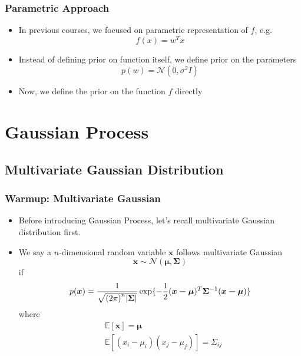 \documentclass{beamer}
\begin{document}
\begin{frame}
	\frametitle{Parametric Approach}
	\begin{itemize}
		\item In previous courses, we focused on parametric representation of $f$, e.g.
		\[
			f(x)=w^Tx
		\]
		\item Instead of defining prior on function itself, we define prior on the parameters
		\[
			p(w) = \mathcal{N}(0, \sigma^2 I)
		\]
		\item Now, we define the prior on the function $f$ directly
	\end{itemize}	
\end{frame}

\section{Gaussian Process}
\subsection{Multivariate Gaussian Distribution}
\begin{frame}
	\frametitle{Warmup: Multivariate Gaussian}
	\begin{itemize}
		\item Before introducing Gaussian Process, let's recall multivariate Gaussian distribution first.
		\item We say a $n$-dimensional random variable $\mathbf{x}$ follows multivariate Gaussian 
			\[
				 \bm{x} \sim \mathcal{N}(\bm{\mu}, \bm{\Sigma})
			\]
			if
			\[
				p(\bm{x}) = \frac{1}{{\sqrt {{{(2\pi )}^n}{\rm{|}}\bm{\Sigma} {\rm{|}}} }}\exp \{  - \frac{1}{2}{(\bm{x-\mu})^T}{\bm{\Sigma} ^{ - 1}}({\bm{x - \mu}})\}
			\]
			where
			\begin{align*}
				& \mathbb{E}[\mathbf{x}] = \bm{\mu} \\
				& \mathbb{E}[(x_i-\mu_i)(x_j-\mu_j)] = \Sigma_{ij}
			\end{align*}
	\end{itemize}
\end{frame}
\end{document}
